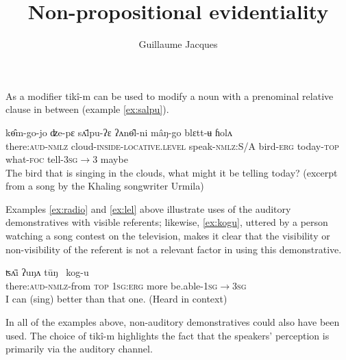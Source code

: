 \documentclass[oldfontcommands,oneside,a4paper,11pt]{article}
\newcommand{\ipa}[1]{{\phon \mbox{#1}}} %
\begin{document}
 
\linenumbers

\title{Non-propositional evidentiality}
\author{Guillaume Jacques}
\maketitle



As a modifier \ipa{tikî-m} can be used to modify   a noun with a prenominal     relative clause  in between (example \ref{ex:salpu}).

\begin{exe}
\ex \label{ex:salpu}
\gll    	 	\ipa{tikî-m}   	\ipa{kɵ̂m-go-jo}   	\ipa{ʣe-pɛ}   	\ipa{sʌ̄lpu-ʔɛ}   	\ipa{ʔʌnɵ̂l-ni}   	\ipa{mâŋ-go}   	\ipa{blɛtt-ʉ}   	\ipa{ɦolʌ}   
 \\
 there:\textsc{aud}-\textsc{nmlz} cloud-\textsc{inside-locative.level} speak-\textsc{nmlz:}S/A bird-\textsc{erg} today-\textsc{top} what-\textsc{foc} tell-\textsc{3sg$\rightarrow$3} maybe \\
\glt The bird that is singing in the clouds, what might it be telling today? (excerpt from a song by the Khaling songwriter Urmila)
\end{exe}
 

 
Examples \ref{ex:radio} and \ref{ex:lel} above illustrate uses of the auditory demonstratives with visible referents; likewise,   \ref{ex:kogu}, uttered by a person watching a song contest on the television, makes it clear that the visibility or non-visibility of the referent is not a relevant factor in using this demonstrative.

\begin{exe}
\ex \label{ex:kogu}
\gll  	\ipa{tikî-m-kʌ}   	\ipa{ʦʌ̄i} \ipa{ʔuŋʌ} \ipa{tūŋ }   	\ipa{kog-u}   \\
there:\textsc{aud}-\textsc{nmlz}-from \textsc{top} \textsc{1sg:erg} more be.able-\textsc{1sg$\rightarrow$3sg}	  \\
\glt I can (sing) better than that one. (Heard in context)
\end{exe}

 

In all of the examples above, non-auditory demonstratives could also have been used. The choice of \ipa{tikî-m}  highlights the  fact that the  speakers' perception is primarily via the auditory channel.
 
 

 
\end{document}
